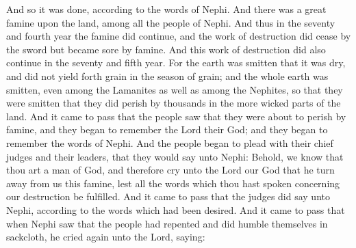 And so it was done, according to the words of Nephi. And there was a great famine upon the land, among all the people of Nephi. And thus in the seventy and fourth year the famine did continue, and the work of destruction did cease by the sword but became sore by famine.
\bverse \iffalse And this work of destruction did also continue in the seventy and fifth year. For the earth was smitten that it was dry, and did not yield forth grain in the season of grain; and the whole earth was smitten, even among the Lamanites as well as among the Nephites, so that they were smitten that they did perish by thousands in the more wicked parts of the land. \fi
And this work of destruction did also continue in the seventy and fifth year. For the earth was smitten that it was dry, and did not yield forth grain in the season of grain; and the whole earth was smitten, even among the Lamanites as well as among the Nephites, so that they were smitten that they did perish by thousands in the more wicked parts of the land.
\bverse \iffalse And it came to pass that the people saw that they were about to perish by famine, and they began to remember the Lord their God; and they began to remember the words of Nephi. \fi
And it came to pass that the people saw that they were about to perish by famine, and they began to remember the Lord their God; and they began to remember the words of Nephi.
\bverse \iffalse And the people began to plead with their chief judges and their leaders, that they would say unto Nephi: Behold, we know that thou art a man of God, and therefore cry unto the Lord our God that he turn away from us this famine, lest all the words which thou hast spoken concerning our destruction be fulfilled. \fi
And the people began to plead with their chief judges and their leaders, that they would say unto Nephi: Behold, we know that thou art a man of God, and therefore cry unto the Lord our God that he turn away from us this famine, lest all the words which thou hast spoken concerning our destruction be fulfilled.
\bverse \iffalse And it came to pass that the judges did say unto Nephi, according to the words which had been desired. And it came to pass that when Nephi saw that the people had repented and did humble themselves in sackcloth, he cried again unto the Lord, saying: \fi
And it came to pass that the judges did say unto Nephi, according to the words which had been desired. And it came to pass that when Nephi saw that the people had repented and did humble themselves in sackcloth, he cried again unto the Lord, saying:
